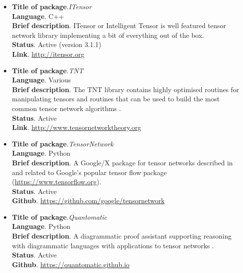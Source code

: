 \begin{itemize}
\item[1.] {\sf \bf Title of package}.\hfill {\it ITensor} \\
{\sf \bf Language}. C++\\ 
{\sf \bf Brief description}. ITensor or Intelligent Tensor is well featured tensor network library implementing a bit of everything out of the box.\\
{\sf \bf Status}. Active (version 3.1.1) \\
{\sf \bf Link}. \url{http://itensor.org} 

    \item[2.] {\sf \bf Title of package}.\hfill {\it TNT} \\
{\sf \bf Language}. Various\\ 
{\sf \bf Brief description}. The TNT library contains highly optimised routines for manipulating tensors and routines that can be used to build the most common tensor network algorithms \cite{2017JSMTE..09.3102A}.\\
{\sf \bf Status}. Active \\
{\sf \bf Link}. \url{http://www.tensornetworktheory.org} 

\item[3.] {\sf \bf Title of package}.\hfill {\it TensorNetwork} \\
{\sf \bf Language}. Python\\ 
{\sf \bf Brief description}. A Google/X package for tensor networks described in \cite{2019arXiv190501330R} and related to Google's popular tensor flow package (\url{https://www.tensorflow.org}). \\ 
{\sf \bf Status}. Active \\
{\sf \bf Github}. \url{https://github.com/google/tensornetwork} 

\item[4.] {\sf \bf Title of package}.\hfill {\it Quantomatic} \\
{\sf \bf Language}. Python\\ 
{\sf \bf Brief description}. A diagrammatic proof assistant supporting reasoning with diagrammatic languages with applications to tensor networks \cite{Dixon2010, Kissinger2014}. \\ 
{\sf \bf Status}. Active \\
{\sf \bf Github}. \url{https://quantomatic.github.io} 






\end{itemize}

